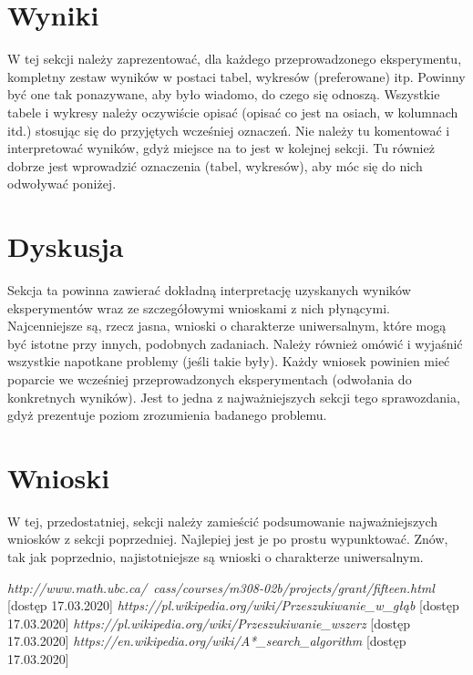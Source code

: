 \documentclass{classrep}
\begin{document}
\section{Wyniki}
{\color{blue}
W tej sekcji należy zaprezentować, dla każdego przeprowadzonego eksperymentu,
kompletny zestaw wyników w postaci tabel, wykresów (preferowane) itp. Powinny
być one tak ponazywane, aby było wiadomo, do czego się odnoszą. Wszystkie
tabele i wykresy należy oczywiście opisać (opisać co jest na osiach, w
kolumnach itd.) stosując się do przyjętych wcześniej oznaczeń. Nie należy tu
komentować i interpretować wyników, gdyż miejsce na to jest w kolejnej sekcji.
Tu również dobrze jest wprowadzić oznaczenia (tabel, wykresów), aby móc się do
nich odwoływać poniżej.}

\section{Dyskusja}
{\color{blue}
Sekcja ta powinna zawierać dokładną interpretację uzyskanych wyników
eksperymentów wraz ze szczegółowymi wnioskami z nich płynącymi. Najcenniejsze
są, rzecz jasna, wnioski o charakterze uniwersalnym, które mogą być istotne
przy innych, podobnych zadaniach. Należy również omówić i wyjaśnić wszystkie
napotkane problemy (jeśli takie były). Każdy wniosek powinien mieć poparcie we
wcześniej przeprowadzonych eksperymentach (odwołania do konkretnych wyników).
Jest to jedna z najważniejszych sekcji tego sprawozdania, gdyż prezentuje
poziom zrozumienia badanego problemu.}

\section{Wnioski}
{\color{blue}
W tej, przedostatniej, sekcji należy zamieścić podsumowanie najważniejszych
wniosków z sekcji poprzedniej. Najlepiej jest je po prostu wypunktować. Znów,
tak jak poprzednio, najistotniejsze są wnioski o charakterze uniwersalnym.}

\begin{thebibliography}{0}
  	
	 \textsl{http://www.math.ubc.ca/~cass/courses/m308-02b/projects/grant/fifteen.html} [dostęp 17.03.2020]
	 \textsl{https://pl.wikipedia.org/wiki/Przeszukiwanie\_w\_głąb} [dostęp 17.03.2020]
	 \textsl{https://pl.wikipedia.org/wiki/Przeszukiwanie\_wszerz} [dostęp 17.03.2020]
			\textsl{https://en.wikipedia.org/wiki/A*\_search\_algorithm} [dostęp 17.03.2020]
\end{thebibliography}
\end{document}
